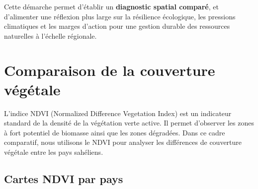 \documentclass[
]{book}
\begin{document}
Cette démarche permet d'établir un \textbf{diagnostic spatial comparé}, et d'alimenter une réflexion plus large sur la résilience écologique, les pressions climatiques et les marges d'action pour une gestion durable des ressources naturelles à l'échelle régionale.

\section{Comparaison de la couverture végétale}\label{comparaison-de-la-couverture-vuxe9guxe9tale}

L'indice NDVI (Normalized Difference Vegetation Index) est un indicateur standard de la densité de la végétation verte active. Il permet d'observer les zones à fort potentiel de biomasse ainsi que les zones dégradées. Dans ce cadre comparatif, nous utilisons le NDVI pour analyser les différences de couverture végétale entre les pays sahéliens.

\subsection{Cartes NDVI par pays}\label{cartes-ndvi-par-pays}
\end{document}
